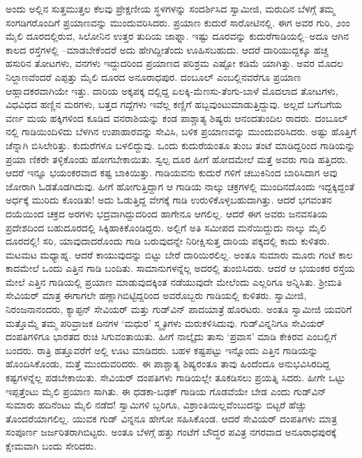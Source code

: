 ಅಂದು ಅಲ್ಲಿನ ಸುತ್ತಮುತ್ತಲ ಕೆಲವು ಪ್ರೇಕ್ಷಣೀಯ ಸ್ಥಳಗಳನ್ನು ಸಂದರ್ಶಿಸಿದ ಸ್ವಾಮೀಜಿ, ಮರುದಿನ ಬೆಳಗ್ಗೆ ತಮ್ಮ ಸಂಗಡಿಗರೊಂದಿಗೆ ಪ್ರಯಾಣವನ್ನು ಮುಂದುವರಿಸಿದರು. ಪ್ರಯಾಣ ಕುದುರೆ ಸಾರೋಟಿನಲ್ಲಿ. ಈಗ ಅವರ ಗುರಿ, ೨ಂಂ ಮೈಲಿ ದೂರದಲ್ಲಿರುವ, ಸಿಲೋನಿನ ಉತ್ತರ ತುದಿಯ ಜಾಫ್ನಾ. ಇಷ್ಟು ದೂರವನ್ನು ಕುದುರೆಗಾಡಿಯಲ್ಲಿ–ಅದೂ ಆಗಿನ ಕಾಲದ ರಸ್ತೆಗಳಲ್ಲಿ –ಮಾಡಬೇಕೆಂದರೆ ಅದು ಹೇಗಿದ್ದೀತೆಂದು ಊಹಿಸಬಹುದು. ಆದರೆ ದಾರಿಯುದ್ದಕ್ಕೂ ಹಚ್ಚ ಹಸುರಿನ ತೋಟಗಳು, ವನಗಳು ಇದ್ದುದರಿಂದ ಪ್ರಯಾಣದ ಪರಿಶ್ರಮ ಎಷ್ಟೋ ಕಡಿಮೆ ಯಾಗಿತ್ತು. ಅವರ ಮೊದಲ ನಿಲ್ದಾಣವೆಂದರೆ ಎಪ್ಪತ್ತು ಮೈಲಿ ದೂರದ ಅನೂರಾಧಪುರ. ದಂಬೂಲ್ ಎಂಬಲ್ಲಿನವರೆಗೂ ಪ್ರಯಾಣ ಆಹ್ಲಾದಕರವಾಗಿಯೇ ಇತ್ತು. ದಾರಿಯ ಅಕ್ಕಪಕ್ಕ ದಲ್ಲಿದ್ದ ಏಲಕ್ಕಿ-ಮೆಣಸು-ತೆಂಗು-ಬಾಳೆ ಮೊದಲಾದ ತೋಟಗಳು, ವಿಧವಿಧದ ಹಣ್ಣಿನ ಮರಗಳು, ಬತ್ತದ ಗದ್ದೆಗಳು ಇವೆಲ್ಲ ಕಣ್ಣಿಗೆ ಹಬ್ಬವುಂಟುಮಾಡುತ್ತಿದ್ದುವು. ಅಲ್ಲದೆ ಬಗೆಬಗೆಯ ವರ್ಣ ಮಯ ಹಕ್ಕಿಗಳಿಂದ ಕೂಡಿದ ವನರಾಶಿಯನ್ನು ಕಂಡ ಪಾಶ್ಚಾತ್ಯ ಶಿಷ್ಯರು ಆನಂದತುಂದಿಲ ರಾದರು. ದಂಬೂಲ್​ನಲ್ಲಿ ಗಾಡಿಯಿಂದಿಳಿದು ಬೆಳಗಿನ ಉಪಾಹಾರವನ್ನು ಸೇವಿಸಿ, ಬಳಿಕ ಪ್ರಯಾಣವನ್ನು ಮುಂದುವರಿಸಿದರು. ಅಷ್ಟು ಹೊತ್ತಿಗೆ ಚೆನ್ನಾಗಿ ಬಿಸಿಲೇರಿತ್ತು. ಕುದುರೆಗಳೂ ಬಳಲಿದ್ದುವು. ಒಂದು ಕುದುರೆಯಂತೂ ತುಂಬ ತಂಟೆ ಮಾಡಿದ್ದರಿಂದ ಗಾಡಿಯನ್ನು ಪ್ರಯಾ ಣಿಕರೇ ತಳ್ಳಿಕೊಂಡು ಹೋಗಬೇಕಾಯಿತು. ಸ್ವಲ್ಪ ದೂರ ಹೀಗೆ ಹೋದಮೇಲೆ ಮತ್ತೆ ಅವರು ಗಾಡಿ ಹತ್ತಿದರು. ಆದರೆ ಇನ್ನೂ ಭಯಂಕರವಾದ ಕಷ್ಟ ಬಾಕಿಯಿತ್ತು. ಗಾಡಿಯವನು ಕುದುರೆ ಗಳಿಗೆ ಚಬುಕಿನಿಂದ ಬಾರಿಸಿದಾಗ ಅವು ಜೋರಾಗಿ ಓಡತೊಡಗಿದುವು. ಹೀಗೆ ಹೋಗುತ್ತಿದ್ದಾಗ ಆ ಗಾಡಿಯ ನಾಲ್ಕು ಚಕ್ರಗಳಲ್ಲಿ ಮುಂದಿನದೊಂದು ಇದ್ದಕ್ಕಿದ್ದಂತೆ ಅರ್ಧಕ್ಕೆ ಮುರಿದು ಕೊಂಡಿತು! ಅದು ಓಡುತ್ತಿದ್ದ ವೇಗಕ್ಕೆ ಗಾಡಿ ಉರುಳಿಕೊಳ್ಳಬಹುದಾಗಿತ್ತು. ಆದರೆ ಭಗವಂತನ ದಯೆಯಿಂದ ಚಕ್ರದ ಅರಗಳು ಭದ್ರವಾಗಿದ್ದುದರಿಂದ ಹಾಗೇನೂ ಆಗಲಿಲ್ಲ. ಆದರೆ ಈಗ ಅವರು ಜನವಸತಿಯ ಪ್ರದೇಶದಿಂದ ಬಹುದೂರದಲ್ಲಿ ಸಿಕ್ಕಿಹಾಕಿಕೊಂಡಿದ್ದರು. ಅಲ್ಲಿಗೆ ಅತಿ ಸಮೀಪದ ಮನೆಯಿದ್ದುದು ನಾಲ್ಕು ಮೈಲಿ ದೂರದಲ್ಲಿ! ಸರಿ, ಯಾವುದಾದರೊಂದು ಗಾಡಿ ಬರುವುದನ್ನೇ ನಿರೀಕ್ಷಿಸುತ್ತ ದಾರಿಯ ಪಕ್ಕದಲ್ಲಿ ಕಾದು ಕುಳಿತರು. ಮಟಮಟ ಮಧ್ಯಾಹ್ನ. ಆದರೆ ಕಾಯುವುದನ್ನು ಬಿಟ್ಟು ಬೇರೆ ದಾರಿಯಿರಲಿಲ್ಲ. ಅಂತೂ ಸುಮಾರು ಮೂರು ಗಂಟೆ ಕಾಲ ಕಾದಮೇಲೆ ಒಂದು ಎತ್ತಿನ ಗಾಡಿ ಬಂದಿತು. ಸಾಮಾನುಗಳನ್ನೆಲ್ಲ ಅದರಲ್ಲಿ ತುಂಬಿಸಿದರು. ಆದರೆ ಆ ಭಯಂಕರ ರಸ್ತೆಯ ಮೇಲೆ ಎತ್ತಿನ ಗಾಡಿಯಲ್ಲಿ ಪ್ರಯಾಣ ಮಾಡುವುದಕ್ಕಿಂತ ನಡೆಯುವುದೇ ಮೇಲೆಂದು ಎಲ್ಲರಿಗೂ ಅನ್ನಿಸಿತು. ಶ್ರೀಮತಿ ಸೇವಿಯರ್ ಮಾತ್ರ ಈಗಾಗಲೇ ಹಣ್ಣಾಗಿಬಿಟ್ಟಿದ್ದರಿಂದ ಅವರೊಬ್ಬರು ಗಾಡಿಯಲ್ಲಿ ಕುಳಿತರು. ಸ್ವಾಮೀಜಿ, ನಿರಂಜನಾನಂದರು, ಕ್ಯಾಪ್ಟನ್ ಸೇವಿಯರ್ ಮತ್ತು ಗುಡ್​ವಿನ್ ಪಾದಯಾತ್ರೆ ಹೊರಟರು. ಅಂತೂ ಸ್ವಾಮೀಜಿ ಯವರಿಗೆ ಮತ್ತೊಮ್ಮೆ ತಮ್ಮ ಪರಿವ್ರಾಜಕ ದಿನಗಳ ‘ಮಧುರ’ ಸ್ಮೃತಿಗಳು ಮರುಕಳಿಸಿದುವು. ಗುಡ್​ವಿನ್ನನಿಗೂ ಸೇವಿಯರ್ ದಂಪತಿಗಳಿಗೂ ಭಾರತದ ರುಚಿ ಸಿಗುವಂತಾಯಿತು. ಹೀಗೆ ನಾಲ್ಕೈದು ತಾಸು ‘ಪ್ರವಾಸ’ ಮಾಡಿ ಕೇಕಿರವ ಎಂಬಲ್ಲಿಗೆ ಬಂದರು. ರಾತ್ರಿ ಹತ್ತೂವರೆಗೆ ಅಲ್ಲಿ ಊಟ ಮಾಡಿದರು. ಬಹಳ ಕಷ್ಟಪಟ್ಟು ಇನ್ನೊಂದು ಎತ್ತಿನ ಗಾಡಿಯನ್ನು ಹೊಂದಿಸಿಕೊಂಡು, ಮತ್ತೆ ಮುಂದುವರಿದರು. ಈ ಪಾಶ್ಚಾತ್ಯ ಶಿಷ್ಯರಂತೂ ತಾವು ಹಿಂದೆಂದೂ ಅನುಭವಿಸಿರದಿದ್ದ ಕಷ್ಟಗಳನ್ನೆಲ್ಲ ಪಡಬೇಕಾಯಿತು. ಸೇವಿಯರ್ ದಂಪತಿಗಳು ಗಾಡಿಯಲ್ಲೇ ತೂಕಡಿಸಲು ಪ್ರಯತ್ನಿ ಸಿದರು. ಹೀಗೇ ಒಟ್ಟು ಇಪ್ಪತ್ತೆಂಟು ಮೈಲಿ ಪ್ರಯಾಣ ಸಾಗಿತು. ಈ ಧಡಕಾ-ಬಢಕ್ ಗಾಡಿಯ ಗೊಡವೆಯೇ ಬೇಡ ಎಂದು ಗುಡ್​ವಿನ್ ಸುಮಾರು ಹದಿನೆಂಟು ಮೈಲಿ ನಡೆದ! ಸ್ವಾಮಿಗಳಿ ಬ್ಬರಿಗೂ, ವಿಶ್ರಾಂತಿಯಿಲ್ಲವೆಂಬುದನ್ನು ಬಿಟ್ಟರೆ ಹೆಚ್ಚು ತೊಂದರೆಯಾಗಲಿಲ್ಲ. ಯುವಕ ಗುಡ್ ವಿನ್ನನೂ ಹೇಗೋ ಸಹಿಸಿಕೊಂಡ. ಆದರೆ ಸೇವಿಯರ್ ದಂಪತಿಗಳು ಮಾತ್ರ ಸಂಪೂರ್ಣ ಜರ್ಜರಿತರಾಗಿಬಿಟ್ಟರು. ಅಂತೂ ಬೆಳಗ್ಗೆ ಹತ್ತು ಗಂಟೆಗೆ ಬೌದ್ಧರ ಪವಿತ್ರ ನಗರವಾದ ಅನೂರಾಧಪುರಕ್ಕೆ ಕ್ಷೇಮವಾಗಿ ಬಂದು ಸೇರಿದರು. 

